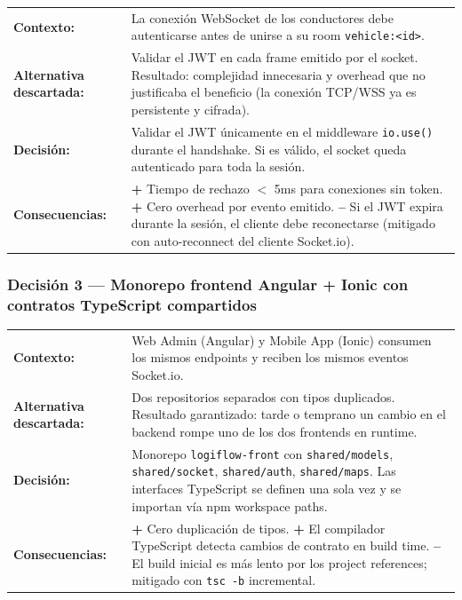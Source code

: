 \documentclass[12pt,a4paper,oneside]{article}
\begin{document}
\begin{tabular}{p{} p{}}
\textbf{Contexto:} & La conexi\'on WebSocket de los conductores debe autenticarse antes de unirse a su room \texttt{vehicle:<id>}. \\
\textbf{Alternativa descartada:} & Validar el JWT en cada frame emitido por el socket. Resultado: complejidad innecesaria y overhead que no justificaba el beneficio (la conexi\'on TCP/WSS ya es persistente y cifrada). \\
\textbf{Decisi\'on:} & Validar el JWT \'unicamente en el middleware \texttt{io.use()} durante el handshake. Si es v\'alido, el socket queda autenticado para toda la sesi\'on. \\
\textbf{Consecuencias:} & \textbf{+} Tiempo de rechazo $<$ 5ms para conexiones sin token. \textbf{+} Cero overhead por evento emitido. \textbf{--} Si el JWT expira durante la sesi\'on, el cliente debe reconectarse (mitigado con auto-reconnect del cliente Socket.io). \\
\end{tabular}

\subsubsection*{Decisi\'on 3 --- Monorepo frontend Angular + Ionic con contratos TypeScript compartidos}

\begin{tabular}{p{} p{}}
\textbf{Contexto:} & Web Admin (Angular) y Mobile App (Ionic) consumen los mismos endpoints y reciben los mismos eventos Socket.io. \\
\textbf{Alternativa descartada:} & Dos repositorios separados con tipos duplicados. Resultado garantizado: tarde o temprano un cambio en el backend rompe uno de los dos frontends en runtime. \\
\textbf{Decisi\'on:} & Monorepo \texttt{logiflow-front} con \texttt{shared/models}, \texttt{shared/socket}, \texttt{shared/auth}, \texttt{shared/maps}. Las interfaces TypeScript se definen una sola vez y se importan v\'ia npm workspace paths. \\
\textbf{Consecuencias:} & \textbf{+} Cero duplicaci\'on de tipos. \textbf{+} El compilador TypeScript detecta cambios de contrato en build time. \textbf{--} El build inicial es m\'as lento por los project references; mitigado con \texttt{tsc -b} incremental. \\
\end{tabular}
\end{document}
